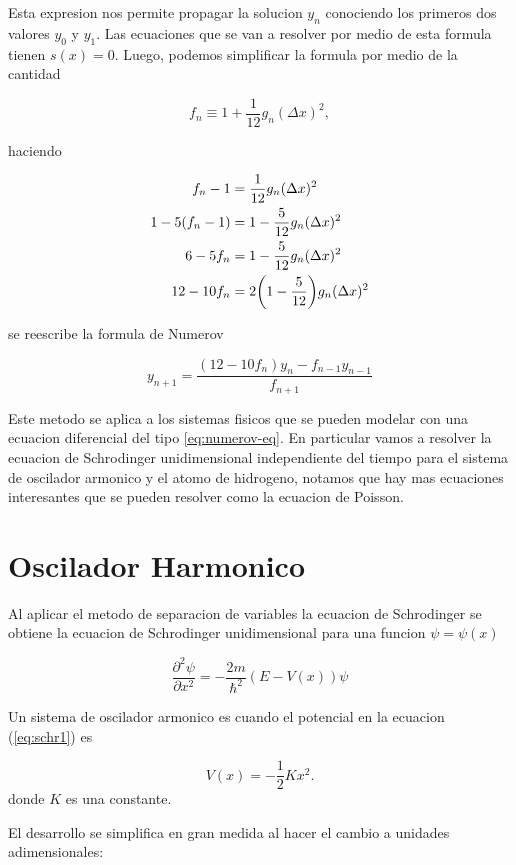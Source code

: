 \documentclass[11pt]{article}
\begin{document}
Esta expresion nos permite propagar la solucion \(y_n\) conociendo los primeros dos valores \(y_0\) y \(y_1\). Las ecuaciones que se van a resolver por medio de esta formula tienen \(s(x)=0\). Luego, podemos simplificar la formula por medio de la cantidad

\[ f_n \equiv 1 + \frac{1}{12}g_n(\Delta x)^2, \]

haciendo

\begin{align*}
    f_n - 1 &= \frac{1}{12}g_n(\Delta x)^2 \\
    1-5(f_n -1) &= 1-\frac{5}{12}g_n(\Delta x)^2 \\
    6-5f_n &= 1-\frac{5}{12}g_n(\Delta x)^2 \\
    12-10f_n &= 2\qty(1-\frac{5}{12})g_n(\Delta x)^2
\end{align*}

se reescribe la formula de Numerov

\begin{equation}
\label{eq:numerov}
    \boxed{y_{n+1} = \frac{(12-10f_n)y_n-f_{n-1}y_{n-1}}{f_{n+1}}}
\end{equation}




Este metodo se aplica a los sistemas fisicos que se pueden modelar con una ecuacion diferencial del tipo \ref{eq:numerov-eq}. En particular vamos a resolver la ecuacion de Schrodinger unidimensional independiente del tiempo para el sistema de oscilador armonico y el atomo de hidrogeno, notamos que hay mas ecuaciones interesantes que se pueden resolver como la ecuacion de Poisson.
\section{Oscilador Harmonico}
\label{sec:orgfbc7872}

Al aplicar el metodo de separacion de variables la ecuacion de Schrodinger se obtiene la ecuacion de Schrodinger unidimensional para una funcion \(\psi = \psi(x)\)

\begin{equation}
\label{eq:schr1}
\frac{\partial^{2}\psi}{\partial x^2} = - \frac{2m}{\hbar^2}(E - V(x))\psi
\end{equation}

Un sistema de oscilador armonico es cuando el potencial en la ecuacion (\ref{eq:schr1}) es

\[ V(x) = - \frac{1}{2}K x^2. \]
donde \(K\) es una constante.

El desarrollo se simplifica en gran medida al hacer el cambio a unidades adimensionales:
\end{document}

